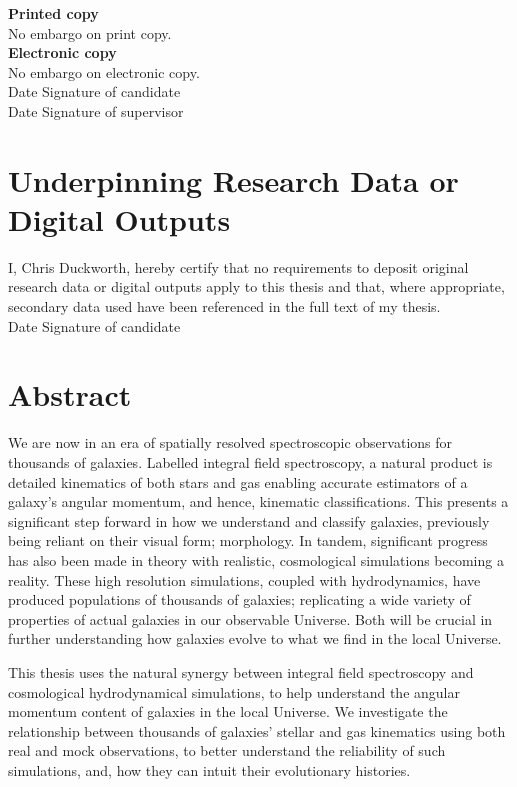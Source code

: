 \documentclass[11pt]{book}
\begin{document}
\noindent \textbf{Printed copy}\\
No embargo on print copy.\\
\textbf{Electronic copy}\\
No embargo on electronic copy.\\

Date  \hspace{1.8in} Signature of candidate \\

Date  \hspace{1.8in} Signature of supervisor \\

\chapter{Underpinning Research Data or Digital Outputs}
I, Chris Duckworth, hereby certify that no requirements to deposit original research data or digital outputs apply to this thesis and that, where appropriate, secondary data used have been referenced in the full text of my thesis.\\

Date \hspace{1.8in} Signature of candidate \\


\chapter{Abstract}
We are now in an era of spatially resolved spectroscopic observations for thousands of galaxies. Labelled integral field spectroscopy, a natural product is detailed kinematics of both stars and gas enabling accurate estimators of a galaxy's angular momentum, and hence, kinematic classifications. This presents a significant step forward in how we understand and classify galaxies, previously being reliant on their visual form; morphology. In tandem, significant progress has also been made in theory with realistic, cosmological simulations becoming a reality. These high resolution simulations, coupled with hydrodynamics, have produced populations of thousands of galaxies; replicating a wide variety of properties of actual galaxies in our observable Universe. Both will be crucial in further understanding how galaxies evolve to what we find in the local Universe. 

This thesis uses the natural synergy between integral field spectroscopy and cosmological hydrodynamical simulations, to help understand the angular momentum content of galaxies in the local Universe. We investigate the relationship between thousands of galaxies' stellar and gas kinematics using both real and mock observations, to better understand the reliability of such simulations, and, how they can intuit their evolutionary histories.
\end{document}
